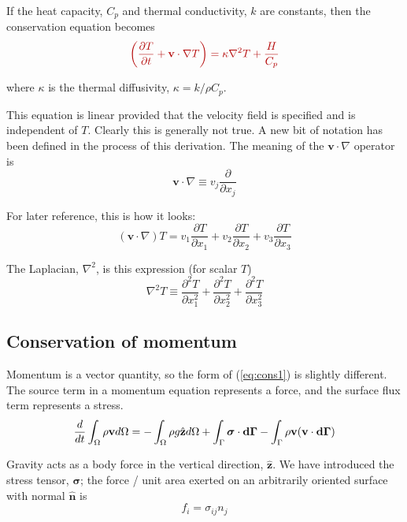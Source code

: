 \documentclass[10pt]{article}
\begin{document}
	If the heat capacity, $C_p$ and thermal conductivity, $k$ are
	constants, then the conservation equation becomes
			\begin{equation}
				\Red{ \left( \frac{\partial T}{\partial t} + \mathbf{v} \cdot \nabla T \right)=
						\kappa \nabla^2 T + \frac{H}{C_p} }
				\label{eq:energycons}		
		\end{equation}
					
	where $\kappa$ is the thermal diffusivity, $\kappa = k/\rho C_p$. 
	
This equation is linear provided that the velocity field is specified and is
independent of $T$. Clearly this is generally not true.
	A new bit of notation has been defined in the process of this derivation. The meaning of
	the $\mathbf{v} \cdot \nabla$ operator is
		\begin{equation}
			\mathbf{v} \cdot \nabla \equiv v_j \frac{\partial}{\partial x_j}
		\end{equation}
	
	 For later reference, this is how it looks:
		\begin{equation}
				(\mathbf{v} \cdot \nabla) T = v_1 \frac{\partial T}{\partial x_1} + 
				v_2 \frac{\partial T}{\partial x_2} + v_3 \frac{\partial T}{\partial x_3}
		\end{equation}
		
	The Laplacian, $\nabla^2$, is this expression (for scalar $T$)
		\begin{equation}
			\nabla^2 T \equiv \frac{\partial^2 T}{\partial x_1^2} + \frac{\partial^2 T}{\partial x_2^2} + \frac{\partial^2 T}{\partial x_3^2} 
		\end{equation}	
	
	\subsection{Conservation of momentum}
	
	Momentum is a vector quantity, so the form of (\ref{eq:cons1}) is slightly different. The 
	source term in a momentum equation represents a force, and the surface flux term
	represents a stress.
		\begin{equation}
			\frac{d}{dt}\int_{\Omega} \rho \mathbf{v} d\Omega = 
			-	\int_{\Omega} \rho g \hat{\mathbf{z}} d\Omega  
			+	\int_{\Gamma} \boldsymbol{\sigma} \cdot \mathbf{d}\boldsymbol{\Gamma} -
				\int_{\Gamma} \rho \mathbf{v} (\mathbf{v} \cdot \mathbf{d}\boldsymbol{\Gamma})	
				\label{eq:momcons1}
		\end{equation}
		
	Gravity acts as a body force in the vertical direction, $\hat{\mathbf{z}}$.
	We have introduced the stress tensor, $\boldsymbol{\sigma}$; the force / unit area exerted
	on an arbitrarily oriented surface with normal $\hat{\mathbf {n}}$ is 
		\begin{equation}
			f_i = \sigma_{ij} n_j
		\end{equation}	
			
\end{document}
